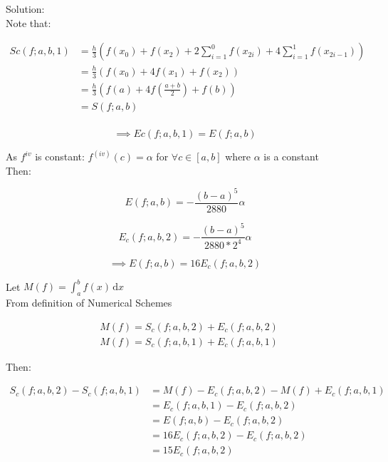 \documentclass[fleqn]{report}
\begin{document}
\noindent Solution: \\

\noindent Note that:

\begin{equation*}
\begin{split}
Sc(f;a,b,1) &= \frac{h}{3} (f(x_0) + f(x_{2}) +  2\sum_{i=1}^{0} f(x_{2i}) + 4\sum_{i=1}^{1} f(x_{2i-1}))\\
            & = \frac{h}{3} (f(x_0) + 4f(x_1) + f(x_2))\\
            & = \frac{h}{3} (f(a) + 4f(\frac{a + b}{2}) + f(b))\\
            & = S(f;a,b)\\
\end{split}
\end{equation*}

\begin{equation*}
\implies Ec(f;a,b,1) = E(f;a,b)
\end{equation*}


\noindent As $f^{iv}$ is constant: $f^{(iv)}(c) = \alpha$ for $ \forall c \in [a,b]$ 
where $\alpha$ is a constant\\ 
Then:

\begin{equation*}
E(f;a,b) = -\frac{(b - a)^5}{2880}\alpha
\end{equation*}

\begin{equation*}
E_c(f;a,b,2) = -\frac{(b - a)^5}{2880 * 2^4}\alpha
\end{equation*}

\begin{equation*}
\implies E(f;a,b) = 16E_c(f;a,b,2)
\end{equation*}


\noindent Let $M(f) = \int_a^b \! f(x) \, \mathrm{d}x$ \\

From definition of Numerical Schemes

\begin{equation*}
\begin{split}
&M(f) = S_c(f;a,b,2) + E_c(f;a,b,2)\\
&M(f) = S_c(f;a,b,1) + E_c(f;a,b,1)
\end{split}
\end{equation*}


Then:

\begin{equation*}
\begin{split}
S_c(f;a,b,2) - S_c(f;a,b,1) & = M(f) - E_c(f;a,b,2) - M(f) + E_c(f;a,b,1)\\
& = E_c(f;a,b,1) - E_c(f;a,b,2)\\
& = E(f;a,b) - E_c(f;a,b,2)\\
& = 16E_c(f;a,b,2) - E_c(f;a,b,2)\\
& = 15E_c(f;a,b,2)\\
\end{split}
\end{equation*}
\end{document}
